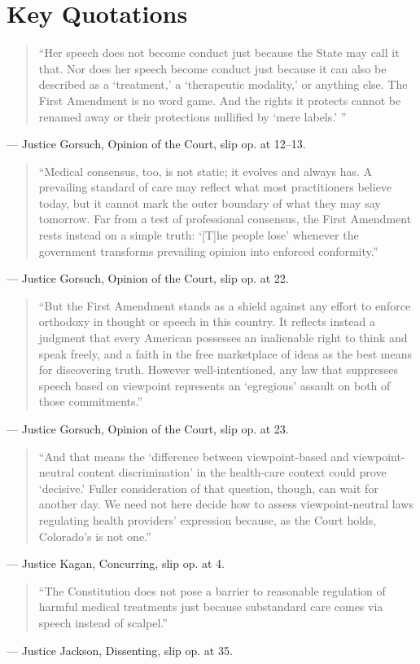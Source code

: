 \documentclass[12pt]{article}
\begin{document}
\section{Key Quotations}

\begin{quote}
``Her speech does not become conduct just because the State may call it that. Nor does her speech become conduct just because it can also be described as a `treatment,' a `therapeutic modality,' or anything else. The First Amendment is no word game. And the rights it protects cannot be renamed away or their protections nullified by `mere labels.' ''
\end{quote}
\noindent --- Justice Gorsuch, Opinion of the Court, slip op. at 12--13.

\begin{quote}
``Medical consensus, too, is not static; it evolves and always has. A prevailing standard of care may reflect what most practitioners believe today, but it cannot mark the outer boundary of what they may say tomorrow. Far from a test of professional consensus, the First Amendment rests instead on a simple truth: `[T]he people lose' whenever the government transforms prevailing opinion into enforced conformity.''
\end{quote}
\noindent --- Justice Gorsuch, Opinion of the Court, slip op. at 22.

\begin{quote}
``But the First Amendment stands as a shield against any effort to enforce orthodoxy in thought or speech in this country. It reflects instead a judgment that every American possesses an inalienable right to think and speak freely, and a faith in the free marketplace of ideas as the best means for discovering truth. However well-intentioned, any law that suppresses speech based on viewpoint represents an `egregious' assault on both of those commitments.''
\end{quote}
\noindent --- Justice Gorsuch, Opinion of the Court, slip op. at 23.

\begin{quote}
``And that means the `difference between viewpoint-based and viewpoint-neutral content discrimination' in the health-care context could prove `decisive.' Fuller consideration of that question, though, can wait for another day. We need not here decide how to assess viewpoint-neutral laws regulating health providers' expression because, as the Court holds, Colorado's is not one.''
\end{quote}
\noindent --- Justice Kagan, Concurring, slip op. at 4.

\begin{quote}
``The Constitution does not pose a barrier to reasonable regulation of harmful medical treatments just because substandard care comes via speech instead of scalpel.''
\end{quote}
\noindent --- Justice Jackson, Dissenting, slip op. at 35.
\end{document}

